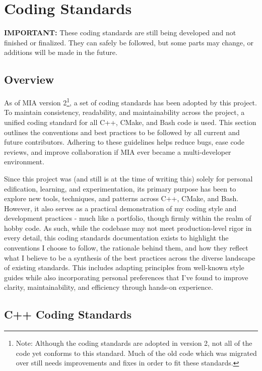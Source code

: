 \chapter{Coding Standards} \label{ch:coding-standards}
\pagestyle{fancy}

\textbf{IMPORTANT:} These coding standards are still being developed and not finished or finalized. They can safely be followed, but some parts may change, or additions will be made in the future.

\section{Overview}

As of MIA version 2\footnote{Note: Although the coding standards are adopted in version 2, not all of the code yet conforms to this standard. Much of the old code which was migrated over still needs improvements and fixes in order to fit these standards.}, a set of coding standards has been adopted by this project. To maintain consistency, readability, and maintainability across the project, a unified coding standard for all C++, CMake, and Bash code is used. This section outlines the conventions and best practices to be followed by all current and future contributors. Adhering to these guidelines helps reduce bugs, ease code reviews, and improve collaboration if MIA ever became a multi-developer environment.

Since this project was (and still is at the time of writing this) solely for personal edification, learning, and experimentation, its primary purpose has been to explore new tools, techniques, and patterns across C++, CMake, and Bash. However, it also serves as a practical demonstration of my coding style and development practices - much like a portfolio, though firmly within the realm of hobby code. As such, while the codebase may not meet production-level rigor in every detail, this coding standards documentation exists to highlight the conventions I choose to follow, the rationale behind them, and how they reflect what I believe to be a synthesis of the best practices across the diverse landscape of existing standards. This includes adapting principles from well-known style guides while also incorporating personal preferences that I’ve found to improve clarity, maintainability, and efficiency through hands-on experience.

\section{C++ Coding Standards}

